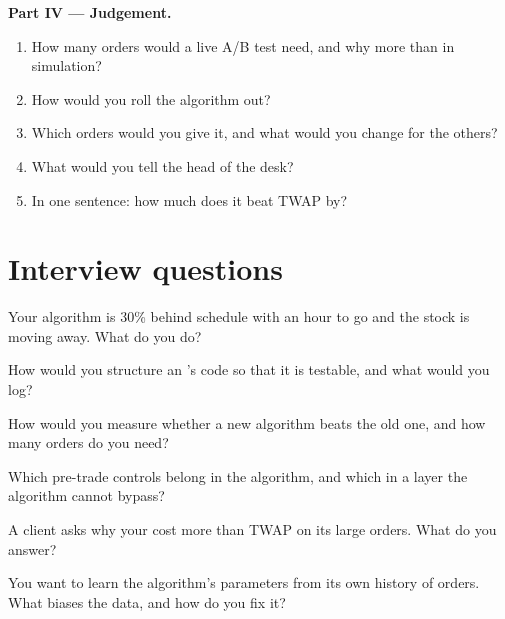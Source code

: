 \begin{problem}
\medskip\noindent\textbf{Part IV --- Judgement.}
\begin{enumerate}[resume]
\item How many orders would a live A/B test need, and why more than in simulation?
\item How would you roll the algorithm out?
\item Which orders would you give it, and what would you change for the others?
\item What would you tell the head of the desk?
\item In one sentence: how much does it beat TWAP by?
\end{enumerate}
\end{problem}

\section{Interview questions}

\begin{interviewq}\label{iq:mx:build-an-execution-algorithm:1}
Your algorithm is 30\% behind schedule with an hour to go and the stock is moving away. What do you do?
\end{interviewq}

\begin{interviewq}\label{iq:mx:build-an-execution-algorithm:2}
How would you structure an 's code so that it is testable, and what would you log?
\end{interviewq}

\begin{interviewq}\label{iq:mx:build-an-execution-algorithm:3}
How would you measure whether a new algorithm beats the old one, and how many orders do you need?
\end{interviewq}

\begin{interviewq}\label{iq:mx:build-an-execution-algorithm:4}
Which pre-trade controls belong in the algorithm, and which in a layer the algorithm cannot bypass?
\end{interviewq}

\begin{interviewq}\label{iq:mx:build-an-execution-algorithm:5}
A client asks why your  cost more than TWAP on its large orders. What do you answer?
\end{interviewq}

\begin{interviewq}\label{iq:mx:build-an-execution-algorithm:6}
You want to learn the algorithm's parameters from its own history of orders. What biases the data, and how do you fix it?
\end{interviewq}
